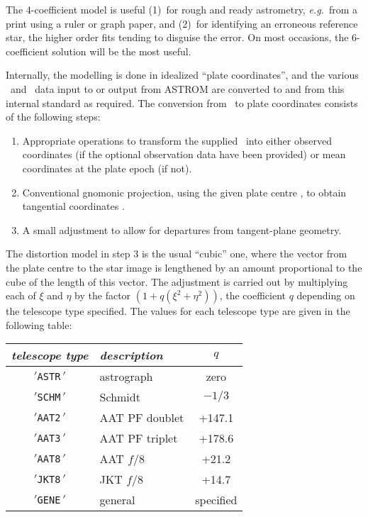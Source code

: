The 4-coefficient model
is useful (1)~for rough and ready astrometry, {\it e.g.}\ from a
print using a ruler or graph paper, and (2)~for identifying
an erroneous reference star, the higher order fits
tending to disguise the error.  On most occasions, the 6-coefficient
solution will be the most useful.

Internally, the modelling is done in idealized ``plate
coordinates'', and the various \radec\ and
\xy\ data input to or output from ASTROM are converted
to and from this internal standard as required.
The conversion
from \radec\ to plate coordinates consists of the following steps:
\begin{enumerate}
 \item Appropriate operations to transform the supplied
       \radec\ into either observed coordinates (if the
       optional observation data have been provided) or
       mean coordinates at the plate epoch (if not).
 \item Conventional gnomonic projection, using the given
       plate centre \radec, to obtain tangential coordinates
       \xieta.
 \item A small adjustment to allow for departures from
       tangent-plane geometry.
\end{enumerate}
The distortion model in step 3 is the usual ``cubic'' one, where
the vector from the plate centre to the star image is
lengthened by an amount
proportional to the cube of the length of this vector.
The adjustment is carried out by multiplying each of
$\xi$ and $\eta$ by the factor $(1 + q (\xi^{2}+\eta^{2}))$,
the coefficient $q$ depending on the telescope type specified.  The
values for each telescope type are given in the following table:

\goodbreak
\begin{center}
\begin{tabular}{|c|l|c|}
\hline
{\it telescope type} & {\it description} & $q$ \\
\hline
$'${\tt ASTR}$\,'$ & astrograph & zero \\
$'${\tt SCHM}$\,'$ & Schmidt & $-1/3$ \\
$'${\tt AAT2}$\,'$ & AAT PF doublet & +147.1 \\
$'${\tt AAT3}$\,'$ & AAT PF triplet & +178.6 \\
$'${\tt AAT8}$\,'$ & AAT $f/8$ & +21.2 \\
$'${\tt JKT8}$\,'$ & JKT $f/8$ & +14.7 \\
$'${\tt GENE}$\,'$ & general & specified \\
\hline
\end{tabular}
\end{center}

